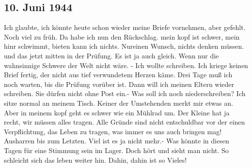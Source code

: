 \subsection{10. Juni 1944}

Ich glaubte, ich k\"{o}nnte heute schon wieder meine Briefe vornehmen, aber gefehlt.
Noch viel zu fr\"{u}h.
Da habe ich nun den R\"{u}ckschlag.
mein kopf ist schwer, mein hinr schwimmt, bieten kann ich nichts.
Nureinen Wunsch, nichts denken m\"{u}ssen.
und das jetzt mitten in der Pr\"{u}fung.
Es ist ja auch gleich.
Wenn nur die wahnsinnige Schwere der Welt nicht w\"{a}re.
- Ich wollte schreiben.
Ich kriege keinen Brief fertig, der nicht aus tief verwundetem Herzen k\"{a}me.
Drei Tage mu{\ss} ich noch warten, bis die Pr\"{u}fung vor\"{u}ber ist.
Dann will ich meinen Eltern wieder schreiben.
Sie d\"{u}rfen nicht ohne Post ein.-
Was soll ich noch niederschreiben?
Ich sitze normal an meinem Tisch.
Keiner der Umstehenden merkt mir etwas an.
Aber in meinem kopf geht es schwer wie ein M\"{u}hlrad um.
Der Kleine hat ja recht, wir m\"{u}ssen alles tragen.
Alle Gr\"{u}nde sind nicht entschuldbar vor der einen Verpflichtung, das Leben zu tragen, was immer es uns auch bringen mag!
Ausharren bis zum Letzten.
Viel ist es ja nicht mehr.-
Was k\"{o}nnte in diesen Tagen f\"{u}r eine Stimmung sein im Lager.
Doch h\"{o}rt und sieht man nicht.
So schleicht sich das leben weiter hin.
Dahin, dahin ist so Vieles!


\clearpage
